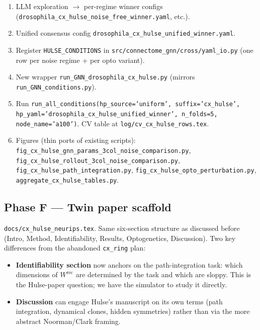 \documentclass[11pt]{article}
\begin{document}
\begin{enumerate}[leftmargin=*]
\item LLM exploration $\to$ per-regime winner configs
  (\texttt{drosophila\_cx\_hulse\_noise\_free\_winner.yaml}, etc.).
\item Unified consensus config
  \texttt{drosophila\_cx\_hulse\_unified\_winner.yaml}.
\item Register \texttt{HULSE\_CONDITIONS} in
  \texttt{src/connectome\_gnn/cross/yaml\_io.py} (one row per noise regime
  + per opto variant).
\item New wrapper \texttt{run\_GNN\_drosophila\_cx\_hulse.py} (mirrors
  \texttt{run\_GNN\_conditions.py}).
\item Run \texttt{run\_all\_conditions(hp\_source='uniform',
  suffix='cx\_hulse', hp\_yaml='drosophila\_cx\_hulse\_unified\_winner',
  n\_folds=5, node\_name='a100')}. CV table at
  \texttt{log/cv\_cx\_hulse\_rows.tex}.
\item Figures (thin ports of existing scripts):
  \texttt{fig\_cx\_hulse\_gnn\_params\_3col\_noise\_comparison.py},
  \texttt{fig\_cx\_hulse\_rollout\_3col\_noise\_comparison.py},
  \texttt{fig\_cx\_hulse\_path\_integration.py},
  \texttt{fig\_cx\_hulse\_opto\_perturbation.py},
  \texttt{aggregate\_cx\_hulse\_tables.py}.
\end{enumerate}

\subsection*{Phase F --- Twin paper scaffold}

\texttt{docs/cx\_hulse\_neurips.tex}. Same six-section structure as
discussed before (Intro, Method, Identifiability, Results, Optogenetics,
Discussion). Two key differences from the abandoned \texttt{cx\_ring}
plan:

\begin{itemize}[leftmargin=*]
\item \textbf{Identifiability section} now anchors on the path-integration
  task: which dimensions of $W^{\text{rec}}$ are determined by the
  task and which are sloppy. This is the Hulse-paper question; we have
  the simulator to study it directly.
\item \textbf{Discussion} can engage Hulse's manuscript on its own terms
  (path integration, dynamical clones, hidden symmetries) rather than via
  the more abstract Noorman/Clark framing.
\end{itemize}
\end{document}
